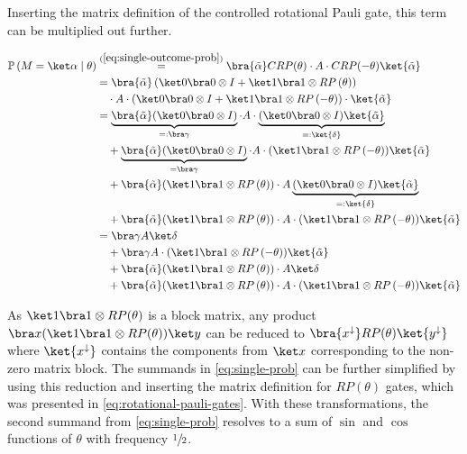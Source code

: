 Inserting the matrix definition of the controlled rotational Pauli gate, this
term can be multiplied out further.

\begin{equation}
    \label{eq:single-prob} 
    \begin{split}
        \mathbb P\left(M = \ket\alpha \mid \theta\right)
            &\stackrel{(\ref{eq:single-outcome-prob})}=\bra{\tilde\alpha} CRP(\theta) \cdot A \cdot CRP(-\theta) \ket{\tilde\alpha} \\
            &=\bra{\tilde\alpha}
                \left(\ket 0 \bra 0 \otimes I + \ket 1 \bra 1 \otimes RP\left(\theta\right)\right) \\
                &\quad \cdot A
                \cdot \left(\ket 0 \bra 0 \otimes I + \ket 1 \bra 1 \otimes RP\left(-\theta\right)\right)
                \cdot \ket{\tilde\alpha} \\
            &= \underbrace{\bra{\tilde\alpha} (\ket 0 \bra 0 \otimes I)}_{=: \bra\gamma} \cdot A \cdot \underbrace{(\ket 0 \bra 0 \otimes I) \ket{\tilde\alpha}}_{=: \ket{\delta}} \\
                &\quad + \underbrace{\bra{\tilde\alpha} (\ket 0 \bra 0 \otimes I)}_{= \bra\gamma} \cdot A \cdot (\ket 1 \bra 1 \otimes RP\left(-\theta\right)) \ket{\tilde\alpha} \\
                &\quad + \bra{\tilde\alpha} (\ket 1 \bra 1 \otimes RP\left(\theta\right)) \cdot A \underbrace{(\ket 0 \bra 0 \otimes I) \ket{\tilde\alpha}}_{=: \ket{\delta}} \\
                &\quad + \bra{\tilde\alpha} (\ket 1 \bra 1 \otimes RP\left(\theta\right)) \cdot A \cdot (\ket 1 \bra 1 \otimes RP\left(-\theta\right)) \ket{\tilde\alpha} \\
            &= \bra\gamma A \ket\delta \\
                &\quad + \bra\gamma A \cdot (\ket 1 \bra 1 \otimes RP\left(-\theta\right)) \ket{\tilde\alpha} \\
                &\quad + \bra{\tilde\alpha} (\ket 1 \bra 1 \otimes RP\left(\theta\right)) \cdot A \ket\delta \\
                &\quad + \bra{\tilde\alpha} (\ket 1 \bra 1 \otimes RP\left(\theta\right)) \cdot A \cdot (\ket 1 \bra 1 \otimes RP\left(-\theta\right)) \ket{\tilde\alpha} \\
    \end{split}
\end{equation}

As $\ket1\bra1 \otimes RP(\theta)$ is a block matrix, any product
$\bra x (\ket1\bra1 \otimes RP(\theta)) \ket y$ can be reduced to
$\bra{x^\downarrow} RP(\theta) \ket{y^\downarrow}$ where $\ket{x^\downarrow}$
contains the components from $\ket x$ corresponding to the non-zero matrix
block.
The summands in \autoref{eq:single-prob} can be further simplified by using this
reduction and inserting the matrix definition for $RP(\theta)$ gates, which was
presented in \autoref{eq:rotational-pauli-gates}.
With these transformations, the second summand from \autoref{eq:single-prob}
resolves to a sum of $\sin$ and $\cos$ functions of $\theta$ with frequency
$\sfrac12$.

